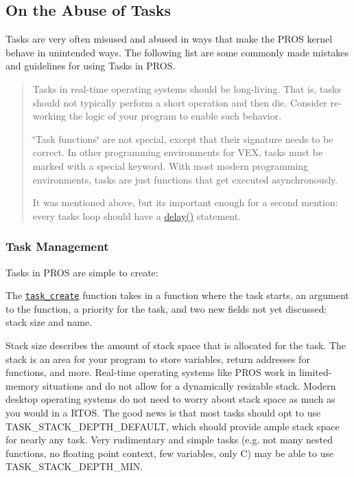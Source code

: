 \subsection*{On the Abuse of Tasks}

Tasks are very often misused and abused in ways that make the P\+R\+OS kernel behave in unintended ways. The following list are some commonly made mistakes and guidelines for using Tasks in P\+R\+OS.

\begin{quote}

\begin{DoxyItemize}
\item Tasks in real-\/time operating systems should be long-\/living. That is, tasks should not typically perform a short operation and then die. Consider re-\/working the logic of your program to enable such behavior.
\item \char`\"{}\+Task functions\char`\"{} are not special, except that their signature needs to be correct. In other programming environments for V\+EX, tasks must be marked with a special keyword. With most modern programming environments, tasks are just functions that get executed asynchronously.
\item It was mentioned above, but it\textquotesingle{}s important enough for a second mention\+: every tasks\textquotesingle{} loop should have a {\ttfamily \hyperlink{rtos_8h_ab8c5a8048d5576a33d7f79b95a2fa0dd}{delay()}} statement. 
\end{DoxyItemize}\end{quote}


\subsubsection*{Task Management}

Tasks in P\+R\+OS are simple to create\+:

The \href{../../api/c/rtos.html#task_create}{\tt task\+\_\+create} function takes in a function where the task starts, an argument to the function, a priority for the task, and two new fields not yet discussed\+: stack size and name.

Stack size describes the amount of stack space that is allocated for the task. The stack is an area for your program to store variables, return addresses for functions, and more. Real-\/time operating systems like P\+R\+OS work in limited-\/memory situations and do not allow for a dynamically resizable stack. Modern desktop operating systems do not need to worry about stack space as much as you would in a R\+T\+OS. The good news is that most tasks should opt to use {\ttfamily T\+A\+S\+K\+\_\+\+S\+T\+A\+C\+K\+\_\+\+D\+E\+P\+T\+H\+\_\+\+D\+E\+F\+A\+U\+LT}, which should provide ample stack space for nearly any task. Very rudimentary and simple tasks (e.\+g. not many nested functions, no floating point context, few variables, only C) may be able to use {\ttfamily T\+A\+S\+K\+\_\+\+S\+T\+A\+C\+K\+\_\+\+D\+E\+P\+T\+H\+\_\+\+M\+IN}.

